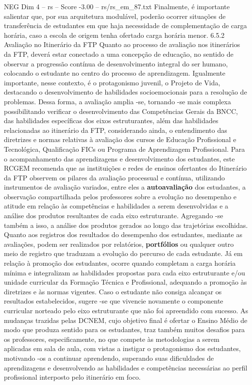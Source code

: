 \begin{textsample}{NEG Dim 4 – rs – Score -3.00 – rs/rs\_em\_87.txt}
Finalmente, é importante salientar que, por sua arquitetura modulável, poderão ocorrer situações de transferência de estudantes em que haja necessidade de complementação de carga horária, caso a escola de origem tenha ofertado carga horária menor. 6.5.2 Avaliação no Itinerário da FTP Quanto ao processo de avaliação nos itinerários da FTP, deverá estar conectado a uma concepção de educação, no sentido de observar a progressão contínua de desenvolvimento integral do ser humano, colocando o estudante no centro do processo de aprendizagem.
Igualmente importante, nesse contexto, é o protagonismo juvenil, o Projeto de Vida, destacando o desenvolvimento de habilidades socioemocionais para a resolução de problemas.
Dessa forma, a avaliação amplia -se, tornando -se mais complexa possibilitando verificar o desenvolvimento das Competências Gerais da BNCC, das habilidades específicas dos eixos estruturantes, além das habilidades relacionadas ao itinerário da FTP, considerando ainda, o entendimento das diretrizes e normas relativas à avaliação dos cursos de Educação Profissional e Tecnológica, Qualificação FICs ou Programa de Aprendizagem Profissional.
Para o acompanhamento das aprendizagens e desenvolvimento dos estudantes, este RCGEM recomenda que as instituições e redes de ensinos ofertantes do Itinerário da FTP observem os pilares da avaliação processual e contínua, utilizando instrumentos de avaliação variados, entre eles a \textbf{autoavaliação} dos estudantes, a observação compartilhada pelos professores sobre a evolução no desempenho e atitude em relação às competências e habilidades a serem desenvolvidas e a análise dos produtos resultantes de cada eixo estruturante.
Agregando -se também a isso, a análise dos produtos gerados ao longo das trajetórias escolhidas.
Quanto aos registros dos resultados do desempenho dos estudantes, mediante as avaliações, podem ser realizados por relatórios, \textbf{portfólios} ou qualquer outro meio de registro que traduzam a evolução do percurso de cada estudante.
Já em relação à promoção dos estudantes, ocorre quando completam a carga horária mínima e integralizam as habilidades propostas para cada eixo estruturante e/ou unidade curricular da Formação Técnica e Profissional, adequando a promoção às diretrizes e às normas vigentes.
Caso o estudante não consiga alcançar os resultados estabelecidos, sugere -se que vivencie novamente o componente curricular norteado pelo eixo estruturante que não foi apreendido com sucesso.
As mudanças trazidas pelas DCNEM, cujo objetivo final é ofertar o Ensino Médio de modo que produza sentido para os estudantes, traz também muitos desafios para os professores, especificamente, no que compete às metodologias a serem aplicadas em sala de aula, com vistas a instigar o protagonismo dos estudantes, motivando -os a continuar aprendendo, superando suas dificuldades de aprendizagens e desenvolvendo as habilidades e competências necessárias ao perfil profissional interposto pelo itinerário em foco.

\end{textsample}
